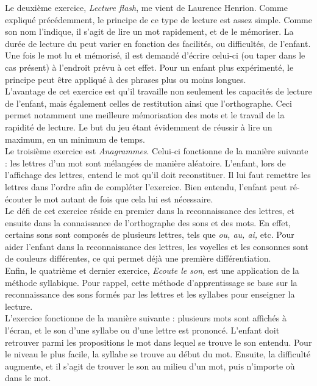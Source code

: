 Le deuxième exercice, \textit{Lecture flash}, me vient de Laurence Henrion. Comme expliqué précédemment, le principe de ce type de lecture est assez simple. Comme son nom l'indique, il s'agit de lire un mot rapidement, et de le mémoriser. La durée de lecture du peut varier en fonction des facilités, ou difficultés, de l'enfant. Une fois le mot lu et mémorisé, il est demandé d'écrire celui-ci (ou taper dans le cas présent) à l'endroit prévu à cet effet. Pour un enfant plus expérimenté, le principe peut être appliqué à des phrases plus ou moins longues.\\

L'avantage de cet exercice est qu'il travaille non seulement les capacités de lecture de l'enfant, mais également celles de restitution ainsi que l'orthographe. Ceci permet notamment une meilleure mémorisation des mots et le travail de la rapidité de lecture. Le but du jeu étant évidemment de réussir à lire un maximum, en un minimum de temps. \\

Le troisième exercice est \textit{Anagrammes}. Celui-ci fonctionne de la manière suivante : les lettres d'un mot sont mélangées de manière aléatoire. L'enfant, lors de l'affichage des lettres, entend le mot qu'il doit reconstituer. Il lui faut remettre les lettres dans l'ordre afin de compléter l'exercice. Bien entendu, l'enfant peut ré-écouter le mot autant de fois que cela lui est nécessaire.\\

Le défi de cet exercice réside en premier dans la reconnaissance des lettres, et ensuite dans la connaissance de l'orthographe des sons et des mots. En effet, certains sons sont composés de plusieurs lettres, tels que \textit{ou, au, ai,} etc. Pour aider l'enfant dans la reconnaissance des lettres, les voyelles et les consonnes sont de couleurs différentes, ce qui permet déjà une première différentiation.\\

Enfin, le quatrième et dernier exercice, \textit{Ecoute le son}, est une application de la méthode syllabique. Pour rappel, cette méthode d'apprentissage se base sur la reconnaissance des sons formés par les lettres et les syllabes pour enseigner la lecture.\\

L'exercice fonctionne de la manière suivante : plusieurs mots sont affichés à l'écran, et le son d'une syllabe ou d'une lettre est prononcé. L'enfant doit retrouver parmi les propositions le mot dans lequel se trouve le son entendu. Pour le niveau le plus facile, la syllabe se trouve au début du mot. Ensuite, la difficulté augmente, et il s'agit de trouver le son au milieu d'un mot, puis n'importe où dans le mot.\\

